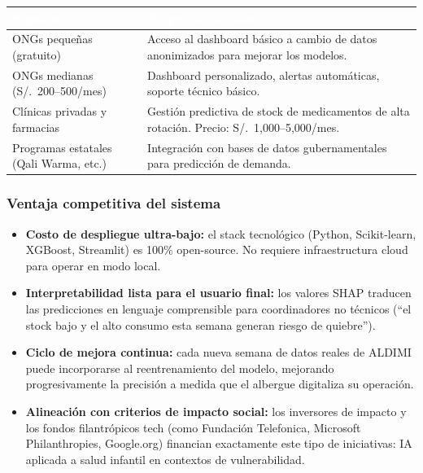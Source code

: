 \documentclass[12pt, a4paper]{article}
\begin{document}
\begin{center}
\begin{tabular}{L{3.8cm} L{9.5cm}}
  \toprule
  \textcolor{white}{\textbf{Segmento}} &
  \textcolor{white}{\textbf{Propuesta de valor}} \\
  \midrule
  ONGs peque\~nas (gratuito) &
  Acceso al dashboard b\'asico a cambio de datos anonimizados para mejorar los modelos. \\
  ONGs medianas (S/.~200--500/mes) &
  Dashboard personalizado, alertas autom\'aticas, soporte t\'ecnico b\'asico. \\
  Cl\'inicas privadas y farmacias &
  Gesti\'on predictiva de stock de medicamentos de alta rotaci\'on. Precio: S/.~1{,}000--5{,}000/mes. \\
  Programas estatales (Qali Warma, etc.) &
  Integraci\'on con bases de datos gubernamentales para predicci\'on de demanda. \\
  \bottomrule
\end{tabular}
\end{center}

\subsubsection{Ventaja competitiva del sistema}

\begin{itemize}[leftmargin=1.5em, itemsep=4pt]
  \item \textbf{Costo de despliegue ultra-bajo:} el stack tecnol\'ogico (Python, Scikit-learn, XGBoost, Streamlit) es 100\% open-source. No requiere infraestructura cloud para operar en modo local.
  \item \textbf{Interpretabilidad lista para el usuario final:} los valores SHAP traducen las predicciones en lenguaje comprensible para coordinadores no t\'ecnicos (``el stock bajo y el alto consumo esta semana generan riesgo de quiebre'').
  \item \textbf{Ciclo de mejora continua:} cada nueva semana de datos reales de ALDIMI puede incorporarse al reentrenamiento del modelo, mejorando progresivamente la precisi\'on a medida que el albergue digitaliza su operaci\'on.
  \item \textbf{Alineaci\'on con criterios de impacto social:} los inversores de impacto y los fondos filantr\'opicos tech (como Fundaci\'on Telefonica, Microsoft Philanthropies, Google.org) financian exactamente este tipo de iniciativas: IA aplicada a salud infantil en contextos de vulnerabilidad.
\end{itemize}
\end{document}

